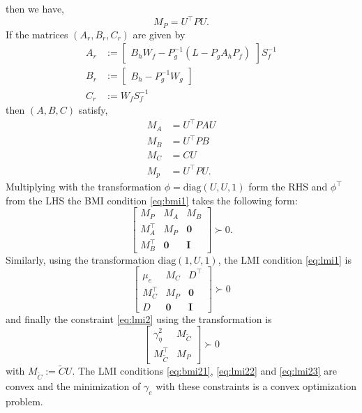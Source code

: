 \documentclass[a4paper]{article}
\begin{document}
then we have, 
\begin{equation}
	M_{P} = U^{\top} {P} U.
\end{equation}
If the matrices $(A_{r}, B_{r}, C_{r})$ are given by 
\begin{equation}
	\begin{aligned}
		A_{r} &:= \begin{bmatrix}
			B_{h} W_{f} - P_{g}^{-1}(L - P_g A_h P_f)
		\end{bmatrix} S_{f}^{-1} \\
		B_{r} &:= \begin{bmatrix}
			B_{h} - P_g^{-1}W_{g}
		\end{bmatrix}\\
		C_{r} &:= W_{f}S_{f}^{-1}
	\end{aligned}
\end{equation}
then $(A, B, C)$ satisfy, 
\begin{align}
	M_{A} &= U^{\top}P A U \\
	M_{B} &= U^{\top}P B\\
	M_{C} &=  C U \\
	M_{p} &= U^{\top}PU.
\end{align}
Multiplying with the transformation $\phi = \textrm{diag}(U, U, 1)$ form the RHS and $\phi^{\top}$  from the LHS the BMI condition \ref{eq:bmi1} takes the following form:
\begin{equation}
	\begin{bmatrix}
		M_{P} & M_{A} & M_{B}\\
		M_{A}^{\top} & M_{P} & \mathbf{0} \\
		M_{B}^{\top} & \mathbf{0} & \mathbf{I}
	\end{bmatrix} \succ 0.
	\label{eq:bmi21}
\end{equation}
Similarly, using the transformation $\textrm{diag}(1, U, 1)$, the LMI condition \ref{eq:lmi1} is 
\begin{equation}
	\begin{bmatrix}	
	\mu_{e} & M_{C} & D^{\top} \\
	M_{C}^{\top} & M_{P} & \mathbf{0} \\
	D & \mathbf{0} & \mathbf{I}
	\end{bmatrix} \succ 0
	\label{eq:lmi22}
\end{equation}
and finally the constraint \ref{eq:lmi2} using the transformation is 
\begin{equation}
	\begin{bmatrix}
		\gamma_{\eta}^{2} & M_{\tilde{C}} \\
		M_{\tilde{C}}^{\top} & M_{P}
	\end{bmatrix} \succ 0 \label{eq:lmi23}
\end{equation}
with $M_{\tilde{C}} := \tilde{C}U$. The LMI conditions  \ref{eq:bmi21}, \ref{eq:lmi22} and \ref{eq:lmi23} are convex and the minimization of $\gamma_{e}$ with these constraints is a convex optimization problem.
\end{document}
